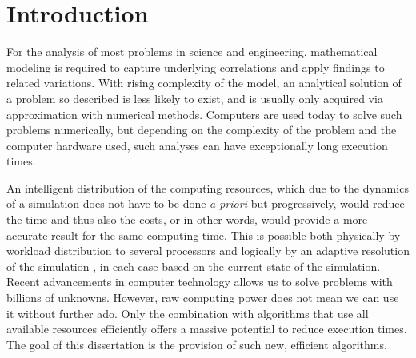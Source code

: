 \chapter{Introduction}
\label{ch:introduction}
\glsresetall

%  


For the analysis of most problems in science and engineering, mathematical modeling is required to capture underlying correlations and apply findings to related variations. With rising complexity of the model, an analytical solution of a problem so described is less likely to exist, and is usually only acquired via approximation with numerical methods. Computers are used today to solve such problems numerically, but depending on the complexity of the problem and the computer hardware used, such analyses can have exceptionally long execution times.

An intelligent distribution of the computing resources, which due to the dynamics of a simulation does not have to be done \textit{a priori} but progressively, would reduce the time and thus also the costs, or in other words, would provide a more accurate result for the same computing time. This is possible both physically by workload distribution to several processors
and logically by
an adaptive resolution of the simulation
, in each case based on the current state of the simulation.
Recent advancements in computer technology allows us to solve problems with billions of unknowns. However, raw computing power does not mean we can use it without further ado. Only the combination with algorithms that use all available resources efficiently offers a massive potential to reduce execution times.
The goal of this dissertation is the provision of such new, efficient algorithms.

